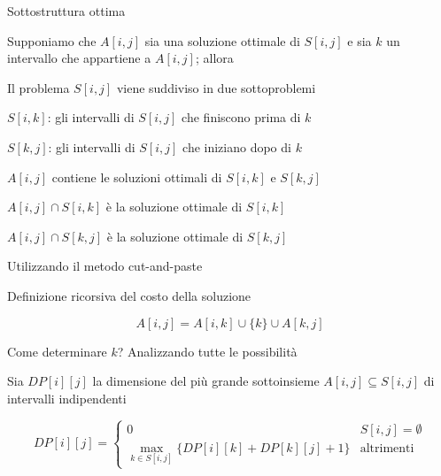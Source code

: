 \begin{frame}{Sottostruttura ottima}

\vspace{-9pt}
\begin{myboxtitle}[Teorema]
Supponiamo che $A[i,j]$ sia una soluzione ottimale di $S[i,j]$ e sia $k$
un intervallo che appartiene a $A[i,j]$; allora

\BIL
\item \alert{Il problema $S[i,j]$ viene suddiviso in due sottoproblemi}
	\BI
	\item $S[i,k]$:  gli intervalli di $S[i,j]$ che finiscono prima di $k$
	\item $S[k,j]$:  gli intervalli di $S[i,j]$ che iniziano dopo di $k$
	\EI
\item \alert{$A[i,j]$ contiene le soluzioni ottimali di $S[i,k]$ e $S[k,j]$}
	\BI
	\item $A[i,j] \cap S[i,k]$ è la soluzione ottimale di $S[i,k]$
	\item $A[i,j] \cap S[k,j]$ è la soluzione ottimale di $S[k,j]$
	\EI
\EIL
\end{myboxtitle}

\begin{myboxtitle}[Dimostrazione]
Utilizzando il metodo cut-and-paste
\end{myboxtitle}
\end{frame}

\begin{frame}{Definizione ricorsiva del costo della soluzione}

\vspace{-9pt}
\begin{myboxtitle}
\[
	A[i,j] = A[i,k] \cup \{ k \} \cup A[k, j]
\]
\end{myboxtitle}

\begin{myboxtitle}
\BIL
\item Come determinare $k$? Analizzando tutte le possibilità
\item Sia $DP[i][j]$ la dimensione del
più grande sottoinsieme $A[i,j] \subseteq S[i,j]$ di intervalli indipendenti

\small
\[
DP[i][j] = \begin{cases}
   0 & S[i,j] = \emptyset \\
	 \max_{k \in S[i,j]} \{ DP[i][k] + DP[k][j] + 1 \} & \textrm{altrimenti}
\end{cases}
\]
\EIL
\end{myboxtitle}
\end{frame}


